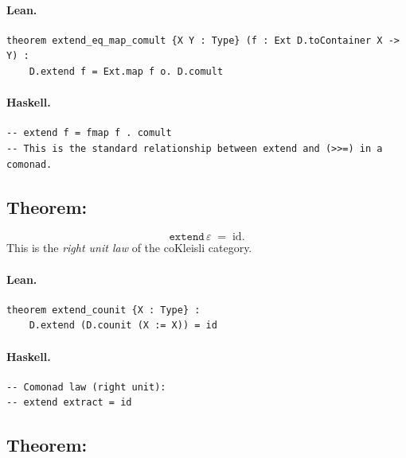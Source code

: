 \documentclass[11pt,a4paper]{article}
\begin{document}
\paragraph{Lean.}
\begin{lstlisting}[style=lean]
theorem extend_eq_map_comult {X Y : Type} (f : Ext D.toContainer X -> Y) :
    D.extend f = Ext.map f o. D.comult
\end{lstlisting}

\paragraph{Haskell.}
\begin{lstlisting}[style=haskell]
-- extend f = fmap f . comult
-- This is the standard relationship between extend and (>>=) in a comonad.
\end{lstlisting}


\subsection{Theorem: }

\begin{thm}
\[
  \mathtt{extend}\,\varepsilon \;=\; \mathrm{id}.
\]
This is the \emph{right unit law} of the coKleisli category.
\end{thm}

\paragraph{Lean.}
\begin{lstlisting}[style=lean]
theorem extend_counit {X : Type} :
    D.extend (D.counit (X := X)) = id
\end{lstlisting}

\paragraph{Haskell.}
\begin{lstlisting}[style=haskell]
-- Comonad law (right unit):
-- extend extract = id
\end{lstlisting}


\subsection{Theorem: }
\end{document}
